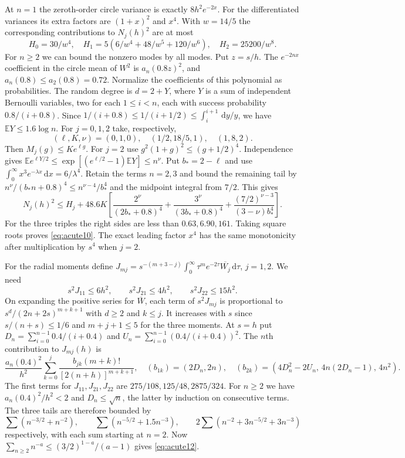 \documentclass[11pt,a4paper,reqno]{amsart}
\theoremstyle{remark}
\numberwithin{equation}{section}
\newcommand{\dd}{\,\mathrm d}
\newcommand{\av}[1]{\overline{#1}}
\begin{document}
At $n=1$ the zeroth-order circle variance is exactly $8h^2 e^{-2x}$.
For the differentiated variances its extra factors are $(1+x)^2$ and $x^4$.
With $w=14/5$ the corresponding contributions to $N_j(h)^2$ are at most
\[
 H_0=30/w^4,\quad H_1=5(6/w^4+48/w^5+120/w^6),\quad H_2=25200/w^8 .
\]
For $n\ge2$ we can bound the nonzero modes by all modes. Put $z=s/h$.
The $e^{-2nx}$ coefficient in the circle mean of $W^2$ is
$a_n(0.8z)^2$, and $a_n(0.8)\le a_2(0.8)=0.72$. Normalize the coefficients
of this polynomial as probabilities. The random degree is $d=2+Y$, where
$Y$ is a sum of independent Bernoulli variables, two for each
$1\le i<n$, each with success probability $0.8/(i+0.8)$. Since
$1/(i+0.8)\le1/(i+1/2)\le\int_i^{i+1}\dd y/y$, we have
$\mathbb EY\le1.6\log n$. For $j=0,1,2$ take, respectively,
\[
 (\ell,K,\nu)=(0,1,0),\quad (1/2,18/5,1),\quad (1,8,2).
\]
Then $M_j(g)\le K e^{\ell g}$. For $j=2$ use
$g^2(1+g)^2\le(g+1/2)^4$. Independence gives
$\mathbb E e^{\ell Y/2}\le\exp[(e^{\ell/2}-1)\mathbb EY]\le n^\nu$.
Put $b_*=2-\ell$ and use $\int_0^\infty x^3 e^{-\lambda x}\dd x=6/\lambda^4$.
Retain the terms $n=2,3$ and bound the remaining tail by
$n^\nu/(b_*n+0.8)^4\le n^{\nu-4}/b_*^4$ and the midpoint integral from
$7/2$. This gives
\[
 N_j(h)^2\le H_j+48.6K\left[
 \frac{2^\nu}{(2b_*+0.8)^4}+\frac{3^\nu}{(3b_*+0.8)^4}
 +\frac{(7/2)^{\nu-3}}{(3-\nu)b_*^4}\right].
 \tag{A.9}\label{eq:acute11}
\]
For the three triples the right sides are less than $0.63,6.90,161$.
Taking square roots proves \eqref{eq:acute10}. The exact leading factor
$x^4$ has the same monotonicity after multiplication by $s^4$ when $j=2$.

For the radial moments define
$J_{mj}=s^{-(m+3-j)}\int_0^\infty\tau^m e^{-2\tau}\av{W_j}\dd\tau$,
$j=1,2$. We need
\[
 s^2 J_{11}\le6h^2,\qquad s^2 J_{21}\le4h^2,\qquad
 s^2 J_{22}\le15h^2 . \tag{A.10}\label{eq:acute12}
\]
On expanding the positive series for $\av W$, each term of $s^2J_{mj}$
is proportional to $s^d/(2n+2s)^{m+k+1}$ with $d\ge2$ and $k\le j$.
It increases with $s$ since $s/(n+s)\le1/6$ and $m+j+1\le5$ for the
three moments. At $s=h$ put $D_n=\sum_{i=0}^{n-1}0.4/(i+0.4)$ and
$U_n=\sum_{i=0}^{n-1}(0.4/(i+0.4))^2$. The $n$th contribution to
$J_{mj}(h)$ is
\[
 \frac{a_n(0.4)^2}{h^2}\sum_{k=0}^j \frac{b_{jk}(m+k)!}{[2(n+h)]^{m+k+1}},
 \quad (b_{1k})=(2D_n,2n),\quad
 (b_{2k})=(4D_n^2-2U_n,\,4n(2D_n-1),\,4n^2).
\]
The first terms for $J_{11},J_{21},J_{22}$ are $275/108,125/48,2875/324$.
For $n\ge2$ we have $a_n(0.4)^2/h^2<2$ and $D_n\le\sqrt n$, the latter
by induction on consecutive terms. The three tails are therefore bounded by
\[
 \sum(n^{-3/2}+n^{-2}),\qquad
 \sum(n^{-5/2}+1.5n^{-3}),\qquad
 2\sum(n^{-2}+3n^{-5/2}+3n^{-3})
\]
respectively, with each sum starting at $n=2$.
Now $\sum_{n\ge2}n^{-a}\le(3/2)^{1-a}/(a-1)$ gives \eqref{eq:acute12}.
\end{document}
